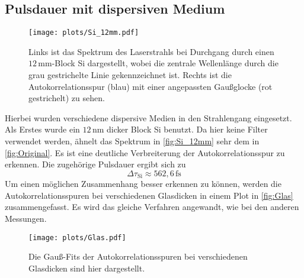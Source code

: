 \subsection{Pulsdauer mit dispersiven Medium}
    \begin{figure}[H]
        \centering\captionsetup{format=plain}\vspace*{-0.5cm}
        \texttt{[image: plots/Si\_12mm.pdf]} \vspace*{-0.5cm}
        \caption{Links ist das Spektrum des Laserstrahls bei Durchgang durch einen $12\,\si{\milli\meter}$-Block Si dargestellt, wobei die zentrale Wellenlänge durch die grau gestrichelte Linie gekennzeichnet ist. Rechts ist die Autokorrelationsspur (blau) mit einer angepassten Gaußglocke (rot gestrichelt) zu sehen.}
        \label{fig:Si_12mm}
    \end{figure}
    \FloatBarrier
    Hierbei wurden verschiedene dispersive Medien in den Strahlengang eingesetzt.
    Als Erstes wurde ein $12\,\si{\nano\meter}$ dicker Block Si benutzt.
    Da hier keine Filter verwendet werden, ähnelt das Spektrum in \autoref{fig:Si_12mm} sehr dem in \autoref{fig:Original}.
    Es ist eine deutliche Verbreiterung der Autokorrelationsspur zu erkennen.
    Die zugehörige Pulsdauer ergibt sich zu
    \begin{equation*}
        \Delta \tau_{\mathrm{Si}} \approx 562,6\,\si{\femto\second}
    \end{equation*}
    Um einen möglichen Zusammenhang besser erkennen zu können, werden die Autokorrelationsspuren bei verschiedenen Glasdicken in einem Plot in \autoref{fig:Glas} zusammengefasst.
    Es wird das gleiche Verfahren angewandt, wie bei den anderen Messungen.
    \begin{figure}[t]
        \centering\captionsetup{format=plain}
        \texttt{[image: plots/Glas.pdf]} \vspace*{-0.5cm}
        \caption{Die Gauß-Fits der Autokorrelationsspuren bei verschiedenen Glasdicken sind hier dargestellt.}
        \label{fig:Glas}
    \end{figure}
    \FloatBarrier

